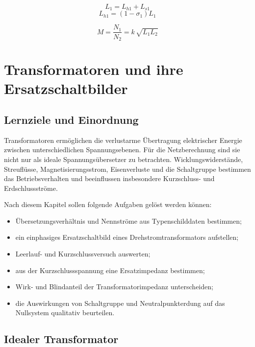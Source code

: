\begin{center}
\begin{minipage}{0.8\textwidth}

\end{minipage}
\end{center}
$$ L_1 = L_{h1} + L_{s1} $$
$$ L_{h1} = (1-\sigma_1) L_1 $$

$$ M = \frac{N_1}{N_2} = k \, \sqrt{L_1 L_2} $$


\chapter{Transformatoren und ihre Ersatzschaltbilder}
\label{chap:transformatoren}

\section{Lernziele und Einordnung}

Transformatoren ermöglichen die verlustarme Übertragung elektrischer Energie
zwischen unterschiedlichen Spannungsebenen. Für die Netzberechnung sind sie
nicht nur als ideale Spannungsübersetzer zu betrachten. Wicklungswiderstände,
Streuflüsse, Magnetisierungsstrom, Eisenverluste und die Schaltgruppe bestimmen
das Betriebsverhalten und beeinflussen insbesondere Kurzschluss- und Erdschlussströme.

Nach diesem Kapitel sollen folgende Aufgaben gelöst werden können:
\begin{itemize}
  \item Übersetzungsverhältnis und Nennströme aus Typenschilddaten bestimmen;
  \item ein einphasiges Ersatzschaltbild eines Drehstromtransformators aufstellen;
  \item Leerlauf- und Kurzschlussversuch auswerten;
  \item aus der Kurzschlussspannung eine Ersatzimpedanz bestimmen;
  \item Wirk- und Blindanteil der Transformatorimpedanz unterscheiden;
  \item die Auswirkungen von Schaltgruppe und Neutralpunkterdung auf das
        Nullsystem qualitativ beurteilen.
\end{itemize}

\section{Idealer Transformator}

